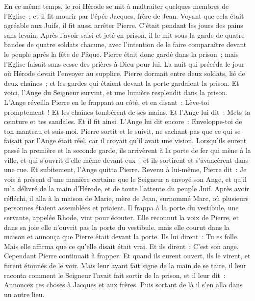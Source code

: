 \begin{multicols}{2}
\VerseOne{}En ce même temps, le roi Hérode se mit à maltraiter quelques membres de l'Eglise~;
et il fit mourir par l'épée Jacques, frère de Jean.
Voyant que cela était agréable aux Juifs, il fit aussi arrêter Pierre. C'était pendant les jours des pains sans levain.
Après l'avoir saisi et jeté en prison, il le mit sous la garde de quatre bandes de quatre soldats chacune, avec l'intention de le faire comparaître devant le peuple après la fête de Pâque.
Pierre était donc gardé dans la prison~; mais l'Eglise faisait sans cesse des prières à Dieu pour lui.
La nuit qui précéda le jour où Hérode devait l'envoyer au supplice, Pierre dormait entre deux soldats, lié de deux chaînes~; et les gardes qui étaient devant la porte gardaient la prison.
Et voici, l'Ange du Seigneur survint, et une lumière resplendit dans la prison. L'Ange réveilla Pierre en le frappant au côté, et en disant~: Lève-toi promptement~! Et les chaînes tombèrent de ses mains.
Et l'Ange lui dit~: Mets ta ceinture et tes sandales. Et il fit ainsi. L'Ange lui dit encore~: Enveloppe-toi de ton manteau et suis-moi.
Pierre sortit et le suivit, ne sachant pas que ce qui se faisait par l'Ange était réel, car il croyait qu'il avait une vision.
Lorsqu'ils eurent passé la première et la seconde garde, ils arrivèrent à la porte de fer qui mène à la ville, et qui s'ouvrit d'elle-même devant eux~; et ils sortirent et s'avancèrent dans une rue. Et subitement, l'Ange quitta Pierre.
Revenu à lui-même, Pierre dit~: Je vois à présent d'une manière certaine que le Seigneur a envoyé son Ange, et qu'il m'a délivré de la main d'Hérode, et de toute l'attente du peuple Juif.
Après avoir réfléchi, il alla à la maison de Marie, mère de Jean, surnommé Marc, où plusieurs personnes étaient assemblées et priaient.
Il frappa à la porte du vestibule, une servante, appelée Rhode, vint pour écouter.
Elle reconnut la voix de Pierre, et dans sa joie elle n'ouvrit pas la porte du vestibule, mais elle courut dans la maison et annonça que Pierre était devant la porte.
Ils lui dirent~: Tu es folle. Mais elle affirma que ce qu'elle disait était vrai.
Et ils dirent~: C'est son ange. Cependant Pierre continuait à frapper. Et quand ils eurent ouvert, ils le virent, et furent étonnés de le voir.
Mais leur ayant fait signe de la main de se taire, il leur raconta comment le Seigneur l'avait fait sortir de la prison, et il leur dit~: Annoncez ces choses à Jacques et aux frères. Puis sortant de là il s'en alla dans un autre lieu.

\end{multicols}
